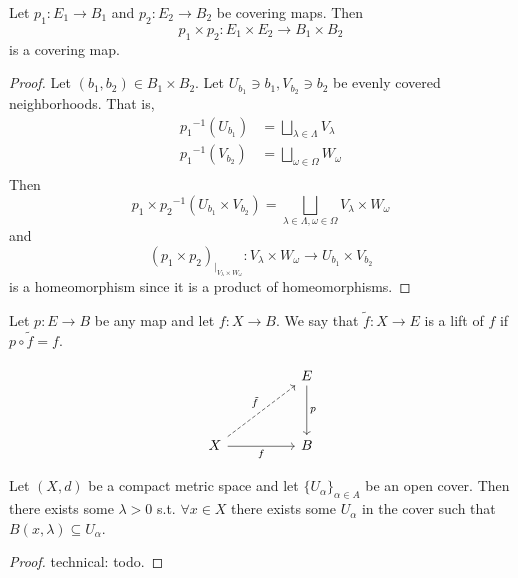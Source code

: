 \begin{theorem}
    Let \( p_1: E_1 \to B_1 \) and \( p_2: E_2 \to B_2 \)
    be covering maps.
    Then 
    \[
      p_1 \times p_2: E_1 \times E_2 \to B_1 \times B_2
    \]
    is a covering map.
\end{theorem}

\begin{proof}
    Let \( (b_1, b_2) \in B_1 \times B_2 \).
    Let \( U_{b_1} \ni b_1, V_{b_2} \ni b_2 \)
    be evenly covered neighborhoods.
    That is,
    \begin{align*}
      {p_1}^{-1} (U_{b_1}) &= \bigsqcup_{\lambda \in \Lambda}
      V_\lambda \\
      {p_1}^{-1} (V_{b_2}) &= \bigsqcup_{\omega \in \Omega}
      W_\omega \\
    \end{align*}
    Then
    \[
      {p_1 \times p_2}^{-1} (U_{b_1} \times V_{b_2})
      = \bigsqcup_{\lambda \in \Lambda, \omega \in \Omega} V_\lambda \times W_\omega
    \]
    and
    \[
      \left(p_1 \times p_2\right)_{|_{V_\lambda \times W_\omega}}
      : V_\lambda \times W_\omega \to U_{b_1} \times V_{b_2}
    \]
    is a homeomorphism since it is a product of homeomorphisms.
\end{proof}

\begin{definition}[Lift]
  Let \( p: E \to B \) be any map
  and let \( f: X \to B \).
  We say that \( \tilde{f}: X \to E \)
  is a lift of \( f \) if \( p \circ \tilde{f} = f \).

\[\begin{tikzcd}
	&& E \\
	\\
	X && B
	\arrow["p", from=1-3, to=3-3]
	\arrow["{\tilde{f}}", dashed, from=3-1, to=1-3]
	\arrow["f"', from=3-1, to=3-3]
\end{tikzcd}\]
\end{definition}

\begin{lemma}
   Let \( (X, d) \) be a compact metric space
   and let \( \{ U_\alpha  \}_{\alpha \in A}  \)
   be an open cover.
   Then there exists some \( \lambda > 0  \)
   s.t. \( \forall x \in X \)
   there exists some \( U_\alpha \) in 
   the cover such that
   \( B(x, \lambda) \subseteq U_\alpha \).
\end{lemma}

\begin{proof}
    technical: todo.
\end{proof}


